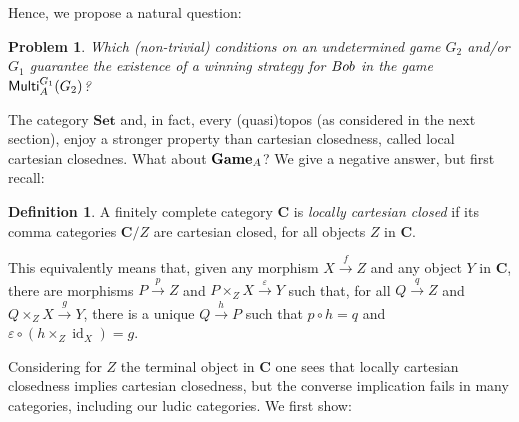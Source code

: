 \documentclass[12pt]{amsart}
\newtheorem{prob}[thm]{Problem}
\theoremstyle{definition}
\newtheorem{defn}[thm]{Definition}
\newcommand{\bob}{\textup{\textmd{\textsc{Bob}}}}
\newcommand{\A}{\textup{\textmd{\textsc{A}}}}
\DeclareMathOperator{\id}{id}
\newcommand{\Sets}{\mathbf{Set}}
\newcommand{\Games}{\mathbf{Game}}
\newcommand{\Multi}{\mathsf{Multi}}
\begin{document}
Hence, we propose a natural question:

\begin{prob}
	Which (non-trivial) conditions on an undetermined game $G_2$ and/or $G_1$ guarantee the existence of a winning strategy for $\bob$ in the game $\Multi_\A^{G_1}(G_2)$?
\end{prob}

The category $\Sets$ and, in fact, every (quasi)topos (as considered in the next section), enjoy a stronger property than cartesian closedness, called local cartesian closednes. What about $\Games_{\A}$? We give a negative answer, but first recall:
\begin{defn}\label{DEF_LocalCC}
	A finitely complete category $\mathbf{C}$ is \emph{locally cartesian closed} if its comma categories $\mathbf{C}/Z$ are cartesian closed, for all objects $Z$ in $\mathbf{C}$. 
	
	This equivalently means \cite{Dyckhoff1987} that, given any morphism $X\stackrel{f}{\to} Z$ and any object $Y$ in $\mathbf{C}$, there are morphisms $P\stackrel{p}{\to}Z$ and $P\times_Z X\stackrel{\varepsilon}{\to} Y$ such that, for all $Q\stackrel{q}{\to}Z$ and $Q\times_Z X\stackrel{g}{\to} Y$, there is a unique $Q\stackrel{h}{\to}P$ such that $p\circ h = q$ and $\varepsilon\circ(h\times_Z \id_X)=g$. 
\end{defn}

Considering for $Z$ the terminal object  in $\mathbf C$ one sees that locally cartesian closedness implies cartesian closedness, but the converse implication fails in many categories, including our ludic categories. We first show: 
\end{document}

